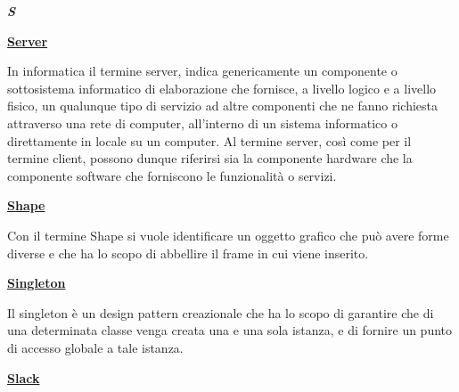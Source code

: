 \newpage
	
\cleardoublepage
{}
{}
\noindent\hrulefill\hspace{4mm}\textbf{\textsl{\Huge{S}}}\hspace{4mm}\hrulefill

\vspace*{2\bigskipamount}

\begin{addmargin}[0em]{0em}
	\textbf{\underline{Server}}
\end{addmargin} 
	
\medskip
\begin{addmargin}[5em]{1em}	
	In informatica il termine server, indica genericamente un componente o sottosistema informatico di elaborazione che fornisce, a livello logico e a livello fisico, un qualunque tipo di servizio ad altre componenti che ne fanno richiesta attraverso una rete di computer, all'interno di un sistema informatico o direttamente in locale su un computer.
Al termine server, così come per il termine client, possono dunque riferirsi sia la componente hardware che la componente software che forniscono le funzionalità o servizi.
\end{addmargin}

\bigskip
\begin{addmargin}[0em]{0em}
	\textbf{\underline{Shape}}
\end{addmargin} 
	
\medskip
\begin{addmargin}[5em]{1em}	
Con il termine Shape si vuole identificare un oggetto grafico che può avere forme diverse e che ha lo scopo di abbellire il frame in cui viene inserito.
\end{addmargin}	

\bigskip
\begin{addmargin}[0em]{0em}
	\textbf{\underline{Singleton}}
\end{addmargin} 
	
\medskip
\begin{addmargin}[5em]{1em}	
Il singleton è un design pattern creazionale che ha lo scopo di garantire che di una determinata classe venga creata una e una sola istanza, e di fornire un punto di accesso globale a tale istanza.
\end{addmargin}	

\bigskip
\begin{addmargin}[0em]{0em}
	\textbf{\underline{Slack}}
\end{addmargin} 
	
